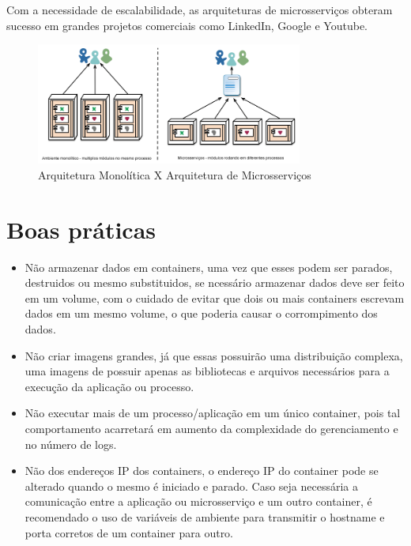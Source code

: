Com a necessidade de escalabilidade, as arquiteturas de microsserviços obteram sucesso em grandes projetos comerciais como LinkedIn, Google e Youtube.

\begin{figure}[htb!]
\caption{Arquitetura Monolítica X Arquitetura de Microsserviços}
\label{fig:}
\includegraphics[height=4cm]{img/cap2/monoXmicro.png}
\centering
\end{figure}




\section{Boas práticas}
\begin{itemize}
	\item Não armazenar dados em containers, uma vez que esses podem ser parados, destruidos ou mesmo substituidos, se ncessário armazenar dados deve ser feito em um volume, com o cuidado de evitar que dois ou mais containers escrevam dados em um mesmo volume, o que poderia causar o corrompimento dos dados.
	\item Não criar imagens grandes, já que essas possuirão uma distribuição complexa, uma imagens de possuir apenas as bibliotecas e arquivos necessários para a execução da aplicação ou processo.
	\item Não executar mais de um processo/aplicação em um único container, pois tal comportamento acarretará em aumento da complexidade do gerenciamento e no número de logs.
	\item Não dos endereços IP dos containers, o endereço IP do container pode se alterado quando o mesmo é iniciado e parado. Caso seja necessária a comunicação entre a aplicação ou microsserviço e um outro container, é recomendado o uso de variáveis de ambiente para transmitir o hostname e porta corretos de um container para outro.
\end{itemize}
\cite{boasPraticas}



